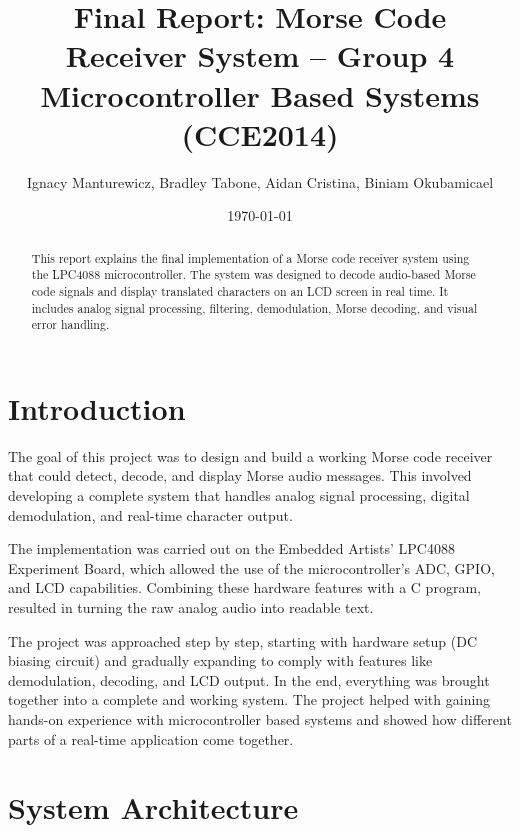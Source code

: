 \documentclass{article}
\title{Final Report: Morse Code Receiver System -- Group 4 \\ \large Microcontroller Based Systems (CCE2014)}
\author{Ignacy Manturewicz, Bradley Tabone, Aidan Cristina, Biniam Okubamicael}
\date{\today}
\begin{document}
\maketitle

\begin{abstract}
This report explains the final implementation of a Morse code receiver system using the
 LPC4088 microcontroller. The system was designed to decode audio-based Morse code signals 
 and display translated characters on an LCD screen in real time. 
 It includes analog signal processing, filtering, demodulation, Morse decoding, 
 and visual error handling.
\end{abstract}

\section{Introduction}
    The goal of this project was to design and build a working Morse code receiver that could detect, decode, 
and display Morse audio messages. This involved developing a complete system that handles analog signal processing, 
digital demodulation, and real-time character output.

The implementation was carried out on the Embedded Artists’ LPC4088 Experiment Board, which allowed the use of
the microcontroller’s ADC, GPIO, and LCD capabilities. Combining these hardware features 
with a C program, resulted in turning the raw analog audio into readable text.

The project was approached step by step, starting with hardware setup (DC biasing circuit) and 
gradually expanding to comply with features like demodulation, decoding, and LCD output. In the end, everything
was brought together into a complete and working system. 
The project helped with gaining hands-on experience with microcontroller based systems and showed
how different parts of a real-time application come together.

\section{System Architecture}
\end{document}
